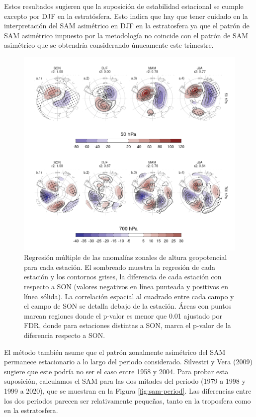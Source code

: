 \documentclass[12pt,oneside,a4paper]{reedthesis}
\begin{document}
Estos resultados sugieren que la suposición de estabilidad estacional se cumple excepto por DJF en la estratósfera.
Esto indica que hay que tener cuidado en la interpretación del SAM asimétrico en DJF en la estratosfera ya que el patrón de SAM asimétrico impuesto por la metodología no coincide con el patrón de SAM asimétrico que se obtendría considerando únucamente este trimestre.



\begin{figure}

{\centering \includegraphics{figures/30-sam/season-regression-1} 

}

\caption{Regresión múltiple de las anomalías zonales de altura geopotencial para cada estación. El sombreado muestra la regresión de cada estación y los contornos grises, la diferencia de cada estación con respecto a SON (valores negativos en línea punteada y positivos en línea sólida). La correlación espacial al cuadrado entre cada campo y el campo de SON se detalla debajo de la estación. Áreas con puntos marcan regiones donde el p-valor es menor que 0.01 ajustado por FDR, donde para estaciones distintas a SON, marca el p-valor de la diferencia respecto a SON.}\label{fig:season-regression}
\end{figure}

El método también asume que el patrón zonalmente asimétrico del SAM permanece estacionario a lo largo del periodo considerado.
Silvestri y Vera (2009) sugiere que este podría no ser el caso entre 1958 y 2004.
Para probar esta suposición, calculamos el SAM para las dos mitades del periodo (1979 a 1998 y 1999 a 2020), que se muestran en la Figura \ref{fig:sam-period}.
Las diferencias entre los dos periodos parecen ser relativamente pequeñas, tanto en la troposfera como en la estratosfera.
\end{document}
